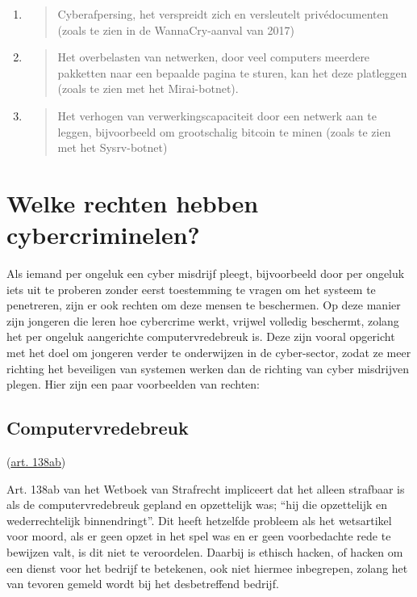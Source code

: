 \documentclass[
]{article}
\begin{document}
\begin{enumerate}
\def\labelenumi{\arabic{enumi})}
\item
  \begin{quote}
  Cyberafpersing, het verspreidt zich en versleutelt privédocumenten
  (zoals te zien in de WannaCry-aanval van 2017)
  \end{quote}
\item
  \begin{quote}
  Het overbelasten van netwerken, door veel computers meerdere pakketten
  naar een bepaalde pagina te sturen, kan het deze platleggen (zoals te
  zien met het Mirai-botnet).
  \end{quote}
\item
  \begin{quote}
  Het verhogen van verwerkingscapaciteit door een netwerk aan te leggen,
  bijvoorbeeld om grootschalig bitcoin te minen (zoals te zien met het
  Sysrv-botnet)
  \end{quote}
\end{enumerate}
\pagebreak
\hypertarget{welke-rechten-hebben-cybercriminelen}{%
\section{Welke rechten hebben
cybercriminelen?}\label{welke-rechten-hebben-cybercriminelen}}

Als iemand per ongeluk een cyber misdrijf pleegt, bijvoorbeeld door per
ongeluk iets uit te proberen zonder eerst toestemming te vragen om het
systeem te penetreren, zijn er ook rechten om deze mensen te beschermen.
Op deze manier zijn jongeren die leren hoe cybercrime werkt, vrijwel
volledig beschermt, zolang het per ongeluk aangerichte
computervredebreuk is. Deze zijn vooral opgericht met het doel om
jongeren verder te onderwijzen in de cyber-sector, zodat ze meer
richting het beveiligen van systemen werken dan de richting van cyber
misdrijven plegen. Hier zijn een paar voorbeelden van rechten:

\hypertarget{computervredebreuk}{%
\subsection{Computervredebreuk}\label{computervredebreuk}}

(\href{https://wetten.overheid.nl/jci1.3:c:BWBR0001854\&boek=Tweede\&titeldeel=V\&artikel=138ab\&z=2021-07-01\&g=2021-07-01}{\underline{art.
138ab}})

Art. 138ab van het Wetboek van Strafrecht impliceert dat het alleen
strafbaar is als de computervredebreuk gepland en opzettelijk was; ``hij
die opzettelijk en wederrechtelijk binnendringt''. Dit heeft hetzelfde
probleem als het wetsartikel voor moord, als er geen opzet in het spel
was en er geen voorbedachte rede te bewijzen valt, is dit niet te
veroordelen. Daarbij is ethisch hacken, of hacken om een dienst voor het
bedrijf te betekenen, ook niet hiermee inbegrepen, zolang het van
tevoren gemeld wordt bij het desbetreffend bedrijf.
\end{document}
